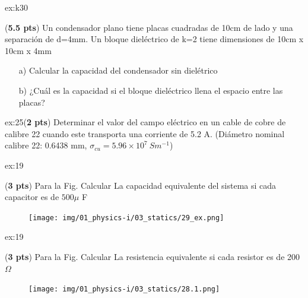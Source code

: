 \begin{multicols}{2}
    \begin{excercise}[][][]{ex:k30}{(\textbf{5.5 pts})
       Un condensador plano tiene placas cuadradas de 10cm de lado y una separación de d=4mm. Un bloque dieléctrico de k=2 tiene dimensiones de 10cm x 10cm x 4mm 
       \begin{itemize}
            \item[a)] Calcular la capacidad del condensador sin dielétrico
            \item[b)] ¿Cuál es la capacidad si el bloque dieléctrico llena el espacio entre las placas?
        \end{itemize} 
        }
    \end{excercise}
    \begin{excercise}[][][]{ex:25}{(\textbf{2 pts})
       Determinar el valor del campo eléctrico en un cable de cobre de calibre 22 cuando este transporta una corriente de 5.2 A. (Diámetro nominal calibre 22: 0.6438 mm, $\sigma_{cu}=5.96\times 10^7\ Sm^{-1}$)
       } 
    \end{excercise}
     \begin{excercise}[][][]{ex:19}{(\textbf{3 pts})
        Para la Fig. Calcular La capacidad equivalente del sistema si cada capacitor es de $500\mu$ F   
         \begin{figure}[H]
             \centering
             \texttt{[image: img/01\_physics-i/03\_statics/29\_ex.png]}
         \end{figure}
    } 
     \end{excercise}
    \begin{excercise}[][][]{ex:19}{(\textbf{3 pts})
       Para la Fig. Calcular La resistencia equivalente si cada resistor es de 200 $\Omega$  
        \begin{figure}[H]
            \centering
            \texttt{[image: img/01\_physics-i/03\_statics/28.1.png]}
        \end{figure}
    } 
    \end{excercise}
\end{multicols}
